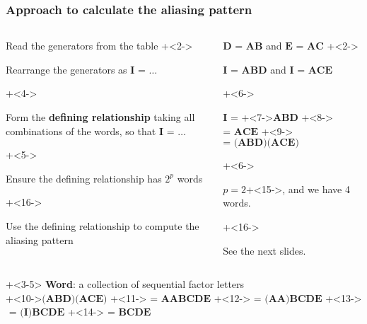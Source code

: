 \begin{frame}\frametitle{Approach to calculate the aliasing pattern}
	
	\begin{columns}[T]
			\begin{enumerate}
				\item	Read the generators from the table 
				\onslide+<2->{
					\item	Rearrange the generators as  $\textbf{I = \ldots}$
				}
				\onslide+<4->{
				 	\item	Form the {\color{purple}\textbf{defining relationship}} taking all combinations of the words, so that $\textbf{I = \ldots}$
				}	
				\onslide+<5->{
				 	\item	Ensure the defining relationship has $2^p$ words
				}
				\onslide+<16->{
					\item	Use the defining relationship to compute the aliasing pattern
				}
			\end{enumerate}
			
		\column{0.5\textwidth}
			\begin{enumerate}
				\item	$\textbf{D = AB}$  and $\textbf{E = AC}$ 
				\onslide+<2->{
					\item	$\textbf{I = ABD}$ and $\textbf{I = ACE}$ 
				}
				
				\onslide+<6->{
 					\item	$\textbf{I =}$ \onslide+<7->{$\textbf{ABD}$} \onslide+<8->{$\textbf{= ACE}$} \onslide+<9->{$\textbf{= (ABD)(ACE)}$} 
					\\ \vspace{0.4cm}
				}
				\onslide+<6->{
								\item	$p=2$\onslide+<15->{, and we have 4 words.}
				}
				\onslide+<16->{
					\item	See the next slides.
					
				}
			\end{enumerate}			
			
	\end{columns}
	\vspace{0.5cm}
	\onslide+<3-5>{
		{\color{purple}\textbf{Word}}: a collection of sequential factor letters
	}
	\\
	\onslide+<10->{$\textbf{(ABD)(ACE)}$}
	\onslide+<11->{$\textbf{ = AABCDE}$}
	\onslide+<12->{$\textbf{ = (AA)BCDE}$}
	\onslide+<13->{$\textbf{ = (I)BCDE}$}
	\onslide+<14->{$\textbf{ = BCDE}$} 	
\end{frame}

